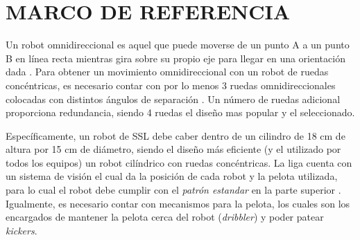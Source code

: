 \documentclass[twocolumn,10pt]{amrob}
\begin{document}
\section*{MARCO DE REFERENCIA}
Un robot omnidireccional es aquel que puede moverse de un punto A a un punto B en línea recta mientras gira sobre su propio eje para llegar en una orientación dada \cite{rojasHist}. Para obtener un movimiento omnidireccional con un robot de ruedas concéntricas, es necesario contar con por lo menos 3 ruedas omnidireccionales colocadas con distintos ángulos de separación \cite{rojasForster06}. Un número de ruedas adicional proporciona redundancia, siendo 4 ruedas el dise\~no mas popular y el seleccionado. \par


Específicamente, un robot de SSL debe caber dentro de un cilindro de 18 cm de altura por 15 cm de diámetro, siendo el diseño más eficiente (y el utilizado por todos los equipos) un robot cilíndrico con ruedas concéntricas. La liga cuenta con un sistema de visión el cual da la posición de cada robot y la pelota utilizada, para lo cual el robot debe cumplir con el \textit{patrón estandar} en la parte superior \cite{SSLrules2016}. Igualmente, es necesario contar con mecanismos para la pelota, los cuales son los encargados de mantener la pelota cerca del robot (\textit{dribbler}) y poder patear \textit{kickers}. \par
\end{document}
